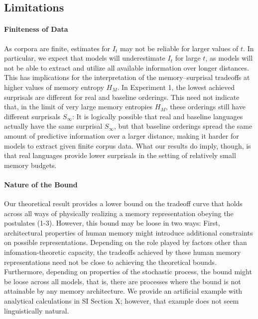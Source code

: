 \subsection{Limitations}

\paragraph{Finiteness of Data}
As corpora are finite, estimates for $I_t$ may not be reliable for larger values of $t$.
In particular, we expect that models will underestimate $I_t$ for large $t$, as models will not be able to extract and utilize all available information over longer distances.
This has implications for the interpretation of the memory--surprisal tradeoffs at higher values of memory entropy $H_M$.
In Experiment 1, the lowest achieved surprisals are different for real and baseline orderings.
This need not indicate that, in the limit of very large memory entropies $H_M$, these orderings still have different surprisals $S_\infty$:
It is logically possible that real and baseline languages actually have the same surprisal $S_\infty$, but that baseline orderings spread the same amount of predictive information over a larger distance, making it harder for models to extract given finite corpus data.
What our results do imply, though, is that real languages provide lower surprisals in the setting of relatively small memory budgets.


\paragraph{Nature of the Bound}
Our theoretical result provides a lower bound on the tradeoff curve that holds across all ways of physically realizing a memory representation obeying the postulates (1-3).
However, this bound may be loose in two ways:
First, architectural properties of human memory might introduce additional constraints on possible representations.
Depending on the role played by factors other than infomation-theoretic capacity, the tradeoffs achieved by these human memory representations need not be close to achieving the theoretical bounds. 
Furthermore, depending on properties of the stochastic process, the bound might be loose across all models, that is, there are processes where the bound is not attainable by any memory architecture.
We provide an artificial example with analytical calculations in SI Section X; however, that example does not seem linguistically natural.

